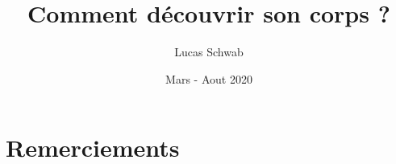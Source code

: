 \documentclass[11pt,french]{article}
\title{Comment découvrir son corps ?}
\author{Lucas Schwab}
\date{Mars - Aout 2020}
\begin{document}
\maketitle








\tableofcontents

\section{Remerciements}
\end{document}
